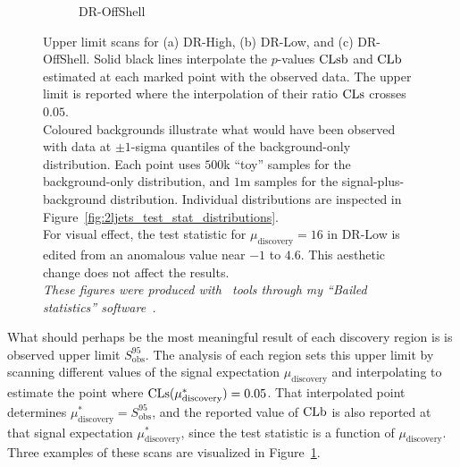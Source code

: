\begin{figure}[tp]
\begin{subfigure}{0.48\textwidth}
\caption{DR-OffShell}
\end{subfigure}
\caption[
Upper limit scans for DR-High and DR-Low
]{%
Upper limit scans for (a) DR-High, (b) DR-Low, and (c) DR-OffShell.
Solid black lines interpolate the $p$-values $\mathrm{CLsb}$ and $\mathrm{CLb}$ estimated at
each marked point with the observed data.
The upper limit is reported where the interpolation of their ratio $\mathrm{CLs}$
crosses $0.05$.
\\[0.5em]
Coloured backgrounds illustrate what would have been observed with data at
$\pm1$-sigma quantiles of the background-only distribution.
Each point uses $500$k ``toy'' samples for the background-only
distribution, and $1$m samples for the signal-plus-background distribution.
Individual distributions are inspected in
Figure~\ref{fig:2ljets_test_stat_distributions}.
\\[0.5em]
For visual effect, the test statistic for $\mu_\textrm{discovery}=16$
in DR-Low is edited from an anomalous value near $-1$ to $4.6$.
This aesthetic change does not affect the results.
\\[0.5em]
\emph{These figures were produced with \histfitter\ tools through
my ``Bailed statistics'' software~\cite{bailedstatisticsgithub}.}
}
\label{fig:2ljets_upper_limit_scans}
\end{figure}

What should perhaps be the most meaningful result of each discovery region is
is observed upper limit $S_{\mathrm{obs}}^{95}$.
The analysis of each region sets this upper limit by scanning different values
of the signal expectation $\mu_\textrm{discovery}$ and interpolating to
estimate the point where $\mathrm{CLs}(\mu_\textrm{discovery}^*) = 0.05$.
That interpolated point determines
$\mu_\textrm{discovery}^* = S_{\mathrm{obs}}^{95}$, and the reported value
of $\mathrm{CLb}$ is also reported at that signal expectation
$\mu_\textrm{discovery}^*$, since the test statistic is a function of
$\mu_\textrm{discovery}$.
Three examples of these scans are visualized in
Figure~\ref{fig:2ljets_upper_limit_scans}.

